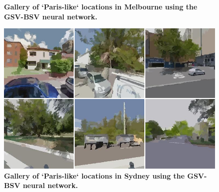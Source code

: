 \documentclass[10pt,letterpaper]{article}
\begin{document}
\begin{figure}[!htbp]
\caption{\bf Gallery of `Paris-like` locations in Melbourne using the GSV-BSV neural network.}    
 \label{fig:gsv_mel_gallery}  
\end{figure} 

\begin{figure}[!htbp]
\centering    
\includegraphics[scale=0.35]{Images/PlosOne/Fig13.png}  
\caption{\bf Gallery of `Paris-like` locations in Sydney using the GSV-BSV neural network.}    
 \label{fig:gsv_syd_gallery}  
\end{figure} 
\end{document}
